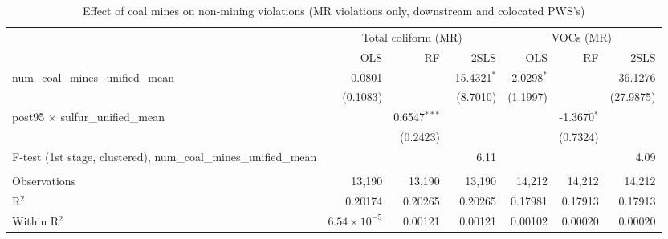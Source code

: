 
\begin{table}[htbp]
   
   \caption{\label{2sls_dwnstrmcolocate_nonminevio_mr} Effect of coal mines on non-mining violations (MR violations only, downstream and colocated PWS's)}
   \bigskip
   
   \centering
   
   \begin{adjustbox}{width = \textwidth, center}
      
      
      \begin{tabular}{lrrrrrr}
         \toprule
         
          & \multicolumn{3}{c}{Total coliform (MR)} & \multicolumn{3}{c}{VOCs (MR)}\\
         
                                                                            & OLS                   & RF             & 2SLS           & OLS           & RF            & 2SLS\\  
         
         \midrule 
         num\_coal\_mines\_unified\_mean                                    & 0.0801                &                & -15.4321$^{*}$ & -2.0298$^{*}$ &               & 36.1276\\   
                                                                            & (0.1083)              &                & (8.7010)       & (1.1997)      &               & (27.9875)\\   
         post95 $\times$ sulfur\_unified\_mean                              &                       & 0.6547$^{***}$ &                &               & -1.3670$^{*}$ &   \\   
                                                                            &                       & (0.2423)       &                &               & (0.7324)      &   \\   
         
         F-test (1st stage, clustered), num\_coal\_mines\_unified\_mean     &                       &                & 6.11           &               &               & 4.09\\  
         
          \\
         
         Observations                                                       & 13,190                & 13,190         & 13,190         & 14,212        & 14,212        & 14,212\\  
         R$^2$                                                              & 0.20174               & 0.20265        & 0.20265        & 0.17981       & 0.17913       & 0.17913\\  
         Within R$^2$                                                       & $6.54\times 10^{-5}$  & 0.00121        & 0.00121        & 0.00102       & 0.00020       & 0.00020\\  
         

\end{tabular}
\end{adjustbox}
\end{table}
